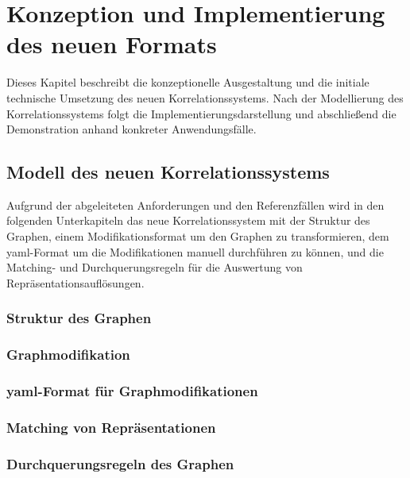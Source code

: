 \chapter{Konzeption und Implementierung des neuen Formats}\label{ch:modeling-implmentation}

Dieses Kapitel beschreibt die konzeptionelle Ausgestaltung und die initiale technische Umsetzung des neuen Korrelationssystems.
Nach der Modellierung des Korrelationssystems folgt die Implementierungsdarstellung und abschließend die Demonstration anhand konkreter Anwendungsfälle.


\section{Modell des neuen Korrelationssystems}\label{sec:model-modellierungsansatz}

Aufgrund der abgeleiteten Anforderungen und den Referenzfällen wird in den folgenden Unterkapiteln das neue Korrelationssystem mit der Struktur des Graphen, einem Modifikationsformat um den Graphen zu transformieren, dem \acrshort{yaml}-Format um die Modifikationen manuell durchführen zu können, und die Matching- und Durchquerungsregeln für die Auswertung von Repräsentationsauflösungen.

\subsection{Struktur des Graphen}\label{subsec:model-graph-struktur}

\subsection{Graphmodifikation}\label{subsec:model-graph-modification}

\subsection{\acrshort{yaml}-Format für Graphmodifikationen}\label{subsec:modell-graph-modification-yaml}

\subsection{Matching von Repräsentationen}\label{subsec:model-matching}

\subsection{Durchquerungsregeln des Graphen}\label{subsec:model-traversal}


